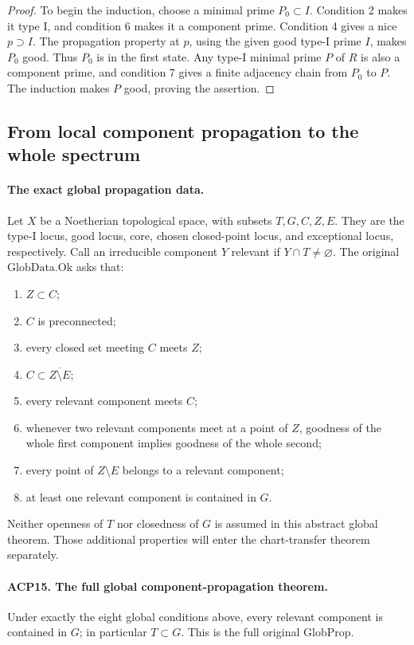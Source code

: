 \documentclass[11pt,a4paper]{article}
\numberwithin{equation}{section}
\theoremstyle{remark}\newtheorem{remark}[theorem]{Remark}
\begin{document}
\begin{proof}
To begin the induction, choose a minimal prime \(P_0\subset I\).
Condition 2 makes it type I, and condition 6 makes it a
component prime.  Condition 4 gives a nice \(p\supset I\).
The propagation property at \(p\), using the given good
type-I prime \(I\), makes \(P_0\) good.  Thus \(P_0\) is in
the first state.  Any type-I minimal prime \(P\) of \(R\)
is also a component prime, and condition 7 gives a finite
adjacency chain from \(P_0\) to \(P\).  The induction makes
\(P\) good, proving the assertion.
\end{proof}

\subsection{From local component propagation to the whole spectrum}

\paragraph{The exact global propagation data.}
Let \(X\) be a Noetherian topological space, with subsets
\(T,G,C,Z,E\).  They are the type-I locus, good locus, core,
chosen closed-point locus, and exceptional locus, respectively.
Call an irreducible component \(Y\) relevant if \(Y\cap T\ne\varnothing\).
The original \(\mathrm{GlobData.Ok}\) asks that:
\begin{enumerate}
\item \(Z\subset C\);
\item \(C\) is preconnected;
\item every closed set meeting \(C\) meets \(Z\);
\item \(C\subset\overline{Z\setminus E}\);
\item every relevant component meets \(C\);
\item whenever two relevant components meet at a point of \(Z\),
      goodness of the whole first component implies goodness of
      the whole second;
\item every point of \(Z\setminus E\) belongs to a relevant component;
\item at least one relevant component is contained in \(G\).
\end{enumerate}
Neither openness of \(T\) nor closedness of \(G\) is assumed
in this abstract global theorem.  Those additional properties
will enter the chart-transfer theorem separately.

\paragraph{ACP15. The full global component-propagation theorem.}
\label{claim:ACP15}
Under exactly the eight global conditions above, every relevant
component is contained in \(G\); in particular \(T\subset G\).
This is the full original \(\mathrm{GlobProp}\).
\end{document}
